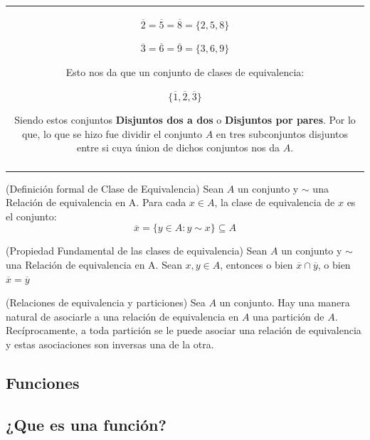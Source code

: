 \documentclass[10pt]{article}
\begin{document}
\begin{table}[H]
\begin{tabular}{||c||}
\begin{minipage}[b]{0.6\linewidth}
				$\overline{2}=\overline{5}=\overline{8}=\{2,5,8\}$
				
				$\overline{3}=\overline{6}=\overline{9}=\{3,6,9\}$
				
				Esto nos da que un conjunto de clases de equivalencia: 
				
				$\{ \overline{1}, \overline{2}, \overline{3}\}$
				
				Siendo estos conjuntos \textbf{Disjuntos dos a dos} o \textbf{Disjuntos por pares}.
				Por lo que, lo que se hizo fue dividir el conjunto $A$ en tres subconjuntos disjuntos entre si 
				cuya únion de dichos conjuntos nos da $A$.				
			\end{minipage}
	\\\\ \hline 		
	\end{tabular}			
\end{table}		

\begin{defi}(Definición formal de Clase de Equivalencia)
Sean $A$ un conjunto y $\sim$ una Relación de equivalencia	 en A. Para cada $	x \in A$, la clase de equivalencia de $x$ es el conjunto:
$$ \overline{x} = \{   y \in A: y \sim x \} \subseteq A$$
\end{defi}

\begin{propo}(Propiedad Fundamental de las clases de equivalencia)
Sean $A$ un conjunto y $\sim$ una Relación de equivalencia	 en A. 
Sean $x,  y \in A$, entonces o bien $\overline{x} \cap \overline{y}$, o bien $\overline{x} = \overline{y}$
\end{propo} 

\begin{propo}(Relaciones de equivalencia y particiones)
Sea $A$ un conjunto. Hay una manera natural de asociarle a una relación de equivalencia en $A$ una partición de $A$. Recíprocamente, a toda partición se le puede asociar una relación de equivalencia y estas asociaciones son inversas una de la otra. 
\end{propo}


\begin{center}
\section{Funciones}
\subsection{¿Que es una función?} 
\end{center}
\end{document}
